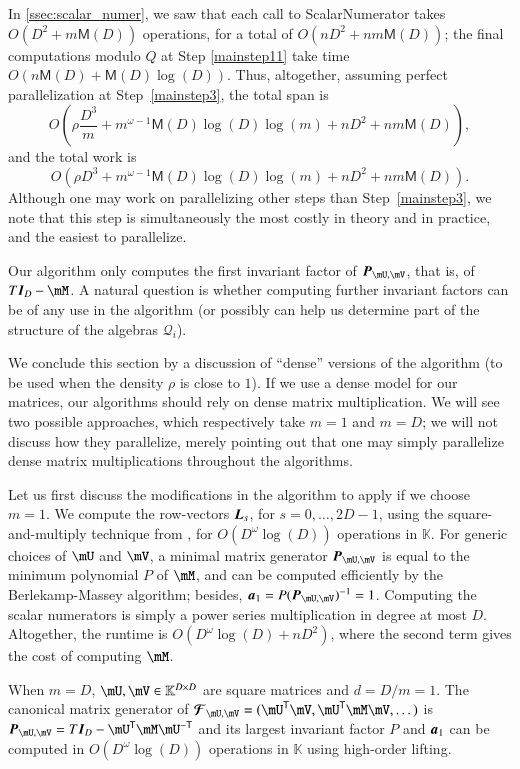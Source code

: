\documentclass[final,1p,times,authoryear]{elsarticle}
\newcommand{\mat}[1]{\bm{\MakeUppercase{#1}}} %
\newcommand{\row}[1]{\bm{\MakeLowercase{#1}}} %
\newcommand{\seq}{\mat{\mathcal{F}}} %
\newcommand{\minpoly}{P}
\newcommand{\residueI}{\mathscr{Q}}
\newcommand{\sqfree}{Q}
\newcommand{\trsp}[1]{#1^{\mathsf{T}}} %
\newcommand{\itrsp}[1]{#1^{\mathsf{-T}}} %
\newcommand{\density}{\rho}
\def\M {\ensuremath{\mathsf{M}}}
\def\K{\mathbb{K}}
\def\K {\ensuremath{\mathbb{K}}}
\newcommand{\mUt}{\trsp{\mU}}
\begin{document}
In \cref{ssec:scalar_numer}, we saw that each call to {\sf ScalarNumerator}
takes $O(D^2 + m\M(D))$ operations, for a total of $O(nD^2 + n
m\M(D))$; the final computations modulo $\sqfree$ at Step \ref{mainstep11} take time $O(n\M(D) + \M(D) \log(D))$.
Thus, altogether, assuming perfect parallelization 
at Step~\ref{mainstep3}, the total span is
$$O\left (\density \frac{D^3}m + m^{\omega-1} \M(D) \log(D) \log(m) + nD^2 + nm\M(D)\right ),$$
and the total work is
$$O\left (\density D^3 + m^{\omega-1} \M(D) \log(D) \log(m) + nD^2 +
nm\M(D)\right ).$$ Although one may work on parallelizing other steps than
Step~\ref{mainstep3}, we note that this step is simultaneously the most costly in
theory and in practice, and the easiest to parallelize. 


\begin{remark}
  Our algorithm only computes the first invariant factor of
  $\mat{P}_{\mU,\mV}$, that is, of $T \mat{I}_D-\mM$. A natural
  question is whether computing further invariant factors can be of
  any use in the algorithm (or possibly can help us determine part of
  the structure of the algebras $\residueI_i$).
\end{remark}

We conclude this section by a discussion of ``dense'' versions of the
algorithm (to be used when the density $\density$ is close to $1$). 
If we use a dense model for our matrices, our algorithms
should rely on dense matrix multiplication. We will see two possible
approaches, which respectively take $m=1$ and $m=D$; we will not
discuss how they parallelize, merely pointing out that one may simply
parallelize dense matrix multiplications throughout the algorithms.

Let us first discuss the modifications in the algorithm to apply if we choose
$m=1$. We compute the
row-vectors $\mat{L}_s$, for $s=0,\dots,2D-1$, using the
square-and-multiply technique from \citep{Keller85},
for $O(D^\omega \log(D))$ operations in
$\K$. For generic choices of $\mU$ and $\mV$, a minimal matrix generator
$\mat{P}_{\mU,\mV}$ is equal to the minimum
polynomial $\minpoly$ of $\mM$, and can be computed efficiently by the
Berlekamp-Massey algorithm; besides,
$\row{a}_1 = P (\mat{P}_{\mU,\mV})^{-1} = 1$. Computing the scalar
numerators is simply a power series multiplication in degree at most
$D$. Altogether, the runtime is $O(D^{\omega} \log(D) + nD^2)$, where
the second term gives the cost of computing $\mM$.

When $m = D$, $\mU,\mV \in \mathbb{K}^{D \times D}$ are square
matrices and $d = D/m = 1$. The canonical matrix generator of
$\seq_{\mU,\mV} = (\mUt\mV, \mUt\mM\mV,\dots)$ is
$\mat{P}_{\mU,\mV} = T \mat{I}_D - \mUt\mM\itrsp{\mU}$ and its
largest invariant factor $\minpoly$ and $\row{a}_1$ can be computed in
$O(D^\omega \log(D))$ operations in $\K$ using high-order lifting.
\end{document}
